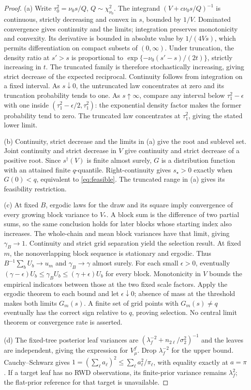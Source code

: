 \begin{proof}
(a) Write $\tau_0^2=\nu_0s/Q$, $Q\sim\chi^2_{\nu_0}$. The integrand $(V+c\nu_0s/Q)^{-1}$ is continuous, strictly decreasing and convex in $s$, bounded by $1/V$. Dominated convergence gives continuity and the limits; integration preserves monotonicity and convexity. Its derivative is bounded in absolute value by $1/(4Vs)$, which permits differentiation on compact subsets of $(0,\infty)$. Under truncation, the density ratio at $s'>s$ is proportional to $\exp\{-\nu_0(s'-s)/(2t)\}$, strictly increasing in $t$. The truncated family is therefore stochastically increasing, giving strict decrease of the expected reciprocal. Continuity follows from integration on a fixed interval. As $s\downarrow0$, the untruncated law concentrates at zero and its truncation probability tends to one. As $s\uparrow\infty$, compare any interval below $\tau_1^2-\epsilon$ with one inside $(\tau_1^2-\epsilon/2,\tau_1^2)$: the exponential density factor makes the former probability tend to zero. The truncated law concentrates at $\tau_1^2$, giving the stated lower limit.

(b) Continuity, strict decrease and the limits in (a) give the root and sublevel set. Joint continuity and strict decrease in $V$ give continuity and strict decrease of a positive root. Since $s^\dagger(V)$ is finite almost surely, $G$ is a distribution function with an attained finite $q$-quantile. Right-continuity gives $s_\star>0$ exactly when $G(0)<q$, equivalent to \eqref{eq:feasible}. The truncated range in (a) gives its feasibility restriction.

(c) At fixed $B$, ergodic laws for the draw and its square imply convergence of every growing block variance to $V_*$. A block sum is the difference of two partial sums, so the same conclusion holds for later blocks whose starting index also increases. The whole-chain and mean block variances have that limit, giving $\gamma_B\to1$. Continuity and strict grid separation yield the selection result.
At fixed $m$, the nonoverlapping block sequence is stationary and ergodic. Thus $B^{-1}\sum_bU_b\to u_m$ and $\gamma_B\to\gamma$ almost surely. For each small $\epsilon>0$, eventually $(\gamma-\epsilon)U_b\le\gamma_BU_b\le(\gamma+\epsilon)U_b$ for every block. Monotonicity in $V$ bounds the empirical indicators between those at the two fixed scale factors. Apply the ergodic theorem to each bound and let $\epsilon\downarrow0$; absence of mass at the threshold makes both limits $G_m(s)$. A finite set of grid points with $G_m(s)\ne q$ eventually has the correct sign relative to $q$, proving selection. No central limit theorem or convergence rate is asserted.

(d) The fixed-tree posterior leaf variances are $(\lambda_f^{-2}+n_{2\ell}/\sigma_2^2)^{-1}$ and the leaves are independent, giving the expression for $V_\mu^f$. Drop $\lambda_f^{-2}$ for the upper bound. Cauchy--Schwarz gives $1=(\sum_\ell a_\ell)^2\le\sum_\ell a_\ell^2/\pi_\ell$, with equality exactly at $a=\pi$. If a target leaf has no RWD observations, its finite-prior variance remains $\lambda_f^2$; the flat-prior reference for that target is unavailable.
\end{proof}

